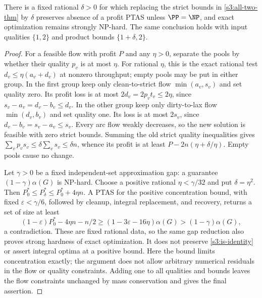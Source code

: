 \begin{proposition}\label{s3:tolerance}
There is a fixed rational $\delta>0$ for which replacing the strict
bounds in \cref{s3:all-two-thm} by $\delta$ preserves absence of a profit
PTAS unless $\PP=\NP$, and exact optimization remains strongly NP-hard.
The same conclusion holds with input qualities $\{1,2\}$ and product
bounds $\{1+\delta,2\}$.
\end{proposition}
\begin{proof}
For a feasible flow with profit $P$ and any $\eta>0$, separate the pools
by whether their quality $p_v$ is at most $\eta$. For rational $\eta$,
this is the exact rational test $d_v\le\eta(a_v+d_v)$ at nonzero
throughput; empty pools may be put in either group. In the first group keep
only clean-to-strict flow $\min(a_v,s_v)$ and set quality zero. Its profit
loss is at most $2d_v=2p_vt_v\le2\eta$, since
$s_v-a_v=d_v-b_v\le d_v$. In the other group keep only dirty-to-lax
flow $\min(d_v,b_v)$ and set quality one. Its loss is at most $2s_v$,
since $d_v-b_v=s_v-a_v\le s_v$. Every arc flow weakly decreases,
so the new solution is feasible with zero strict bounds. Summing the
old strict quality inequalities gives
$\sum_v p_vs_v\le\delta\sum_v s_v\le\delta n$, whence its profit is
at least $P-2n(\eta+\delta/\eta)$. Empty pools cause no change.

Let $\gamma>0$ be a fixed independent-set approximation gap: a guarantee
$(1-\gamma)\alpha(G)$ is NP-hard. Choose a positive rational
$\eta<\gamma/32$ and put $\delta=\eta^2$. Then
$P_0^*\le P_\delta^*\le P_0^*+4\eta n$.
A PTAS for the positive concentration bound, with fixed
$\varepsilon<\gamma/6$, followed
by cleanup, integral replacement, and recovery, returns a set of size
at least
\[
 (1-\varepsilon)P_0^*-4\eta n-n/2
 \ge(1-3\varepsilon-16\eta)\alpha(G)
 >(1-\gamma)\alpha(G),
\]
a contradiction. These are fixed rational data, so the same gap reduction
also proves strong hardness of exact optimization. It does not preserve
\eqref{s3:is-identity} or assert integral optima at a positive bound.
Here the bound limits concentration exactly; the argument does not allow
arbitrary numerical residuals in the flow or quality constraints.
Adding one to all qualities and bounds leaves the flow constraints
unchanged by mass conservation and gives the final assertion.
\end{proof}

